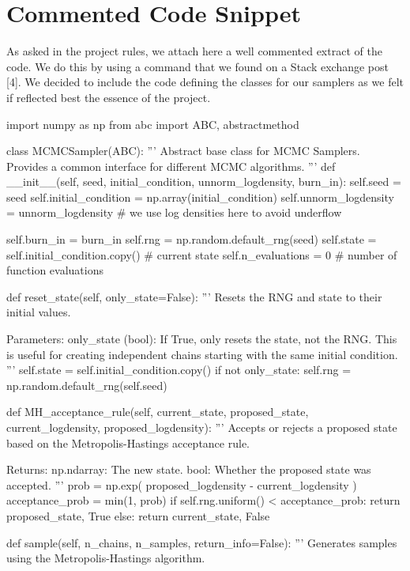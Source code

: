 \documentclass[a4paper, 12pt,oneside]{article}
\begin{document}
		\section{Commented Code Snippet}\label{appendix:commented-code-snippet}
		As asked in the project rules, we attach here a well commented extract of the code. We do this by using a command that we found on a Stack exchange post [4]. We decided to include the code defining the classes for our samplers as we felt if reflected best the essence of the project.
		\begin{python}
			import numpy as np
			from abc import ABC, abstractmethod

			class MCMCSampler(ABC):
				'''
				Abstract base class for MCMC Samplers. Provides a common interface for different MCMC algorithms.
				'''
				def __init__(self, seed, initial_condition, unnorm_logdensity, burn_in):
					self.seed = seed
					self.initial_condition = np.array(initial_condition)
					self.unnorm_logdensity = unnorm_logdensity
					# we use log densities here to avoid underflow
					
					self.burn_in = burn_in
					self.rng = np.random.default_rng(seed)
					self.state = self.initial_condition.copy() # current state
					self.n_evaluations = 0 # number of function evaluations
				
				def reset_state(self, only_state=False):
					'''
					Resets the RNG and state to their initial values.

					Parameters:
					only_state (bool): If True, only resets the state, not the RNG. This is useful for creating independent chains starting with the same initial condition.
					'''
					self.state = self.initial_condition.copy()
					if not only_state:
						self.rng = np.random.default_rng(self.seed)
				
				def MH_acceptance_rule(self, current_state, proposed_state, current_logdensity, proposed_logdensity):
					'''
					Accepts or rejects a proposed state based on the Metropolis-Hastings acceptance rule.

					Returns:
					np.ndarray: The new state.
					bool: Whether the proposed state was accepted.
					'''
					prob = np.exp( proposed_logdensity - current_logdensity )
					acceptance_prob = min(1, prob)
					if self.rng.uniform() < acceptance_prob:
						return proposed_state, True
					else:
						return current_state, False

				def sample(self, n_chains, n_samples, return_info=False):
					'''
					Generates samples using the Metropolis-Hastings algorithm.


\end{python}
\end{document}

